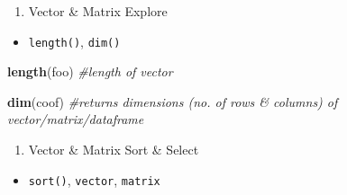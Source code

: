\documentclass[]{book}
\newenvironment{Shaded}{\begin{snugshade}}{\end{snugshade}}
\newcommand{\CommentTok}[1]{\textcolor[rgb]{0.56,0.35,0.01}{\textit{#1}}}
\newcommand{\KeywordTok}[1]{\textcolor[rgb]{0.13,0.29,0.53}{\textbf{#1}}}
\newcommand{\NormalTok}[1]{#1}
\providecommand{\tightlist}{%
  \setlength{\itemsep}{0pt}\setlength{\parskip}{0pt}}
\begin{document}
\begin{enumerate}
\def\labelenumi{\arabic{enumi}.}
\setcounter{enumi}{9}
\tightlist
\item
  Vector \& Matrix Explore
\end{enumerate}

\begin{itemize}
\tightlist
\item
  \texttt{length()}, \texttt{dim()}
\end{itemize}

\begin{Shaded}
\begin{Highlighting}[]
\KeywordTok{length}\NormalTok{(foo) }\CommentTok{#length of vector}

\KeywordTok{dim}\NormalTok{(coof) }\CommentTok{#returns dimensions (no. of rows & columns) of vector/matrix/dataframe}
\end{Highlighting}
\end{Shaded}

\begin{enumerate}
\def\labelenumi{\arabic{enumi}.}
\setcounter{enumi}{10}
\tightlist
\item
  Vector \& Matrix Sort \& Select
\end{enumerate}

\begin{itemize}
\tightlist
\item
  \texttt{sort()}, \texttt{\textquotesingle{}vector\textquotesingle{}{[}{]}}, \texttt{\textquotesingle{}matrix\textquotesingle{}{[}{]}}
\end{itemize}
\end{document}
